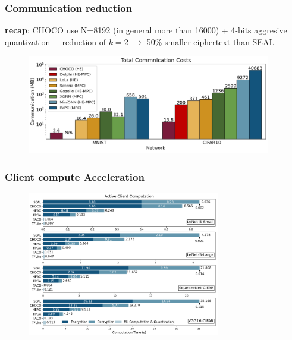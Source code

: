 \documentclass[10pt,handout]{beamer}
\begin{document}



\begin{frame}
\frametitle{Communication reduction}
   \textbf{recap}: CHOCO use N=8192 (in general more than 16000) +
4-bits aggresive quantization + reduction of $k=2$ $\rightarrow$ 50\% smaller ciphertext than SEAL


    \begin{figure}
        \includegraphics[width=0.95\textwidth]{comunication.png}
    \end{figure}

\end{frame}






\begin{frame}
    \frametitle{Client compute Acceleration}
    \begin{figure}
    \includegraphics[width=0.75\textwidth]{motivation2.png}
\end{figure}


\end{frame}
\end{document}
